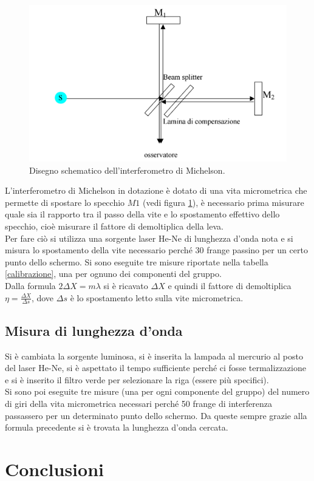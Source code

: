 \documentclass[10pt,a4paper]{article}
\begin{document}
\begin{figure}[!htb]
  \centering
  \includegraphics[scale=.5]{interferometro.png}
\caption{Disegno schematico dell'interferometro di Michelson.}
\label{int}
\end{figure}

L'interferometro di Michelson in dotazione è dotato di una vita micrometrica che permette di spostare lo specchio $M1$ (vedi figura \ref{int}), è necessario prima misurare quale sia il rapporto tra il passo della vite e lo spostamento effettivo dello specchio, cioè misurare il fattore di demoltiplica della leva. \\
Per fare ciò si utilizza una sorgente laser He-Ne di lunghezza d'onda nota e si misura lo spostamento della vite necessario perché 30 frange passino per un certo punto dello schermo. Si sono eseguite tre misure riportate nella tabella \ref{calibrazione}, una per ognuno dei componenti del gruppo.\\

Dalla formula $2 \Delta X = m \lambda$ si è ricavato $\Delta X$ e quindi il fattore di demoltiplica $\eta = \frac{\Delta X}{\Delta s}$, dove $\Delta s$ è lo spostamento letto sulla vite micrometrica.

\subsection{Misura di lunghezza d'onda}
Si è cambiata la sorgente luminosa, si è inserita la lampada al mercurio al posto del laser He-Ne, si è aspettato il tempo sufficiente perché ci fosse termalizzazione e si è inserito il filtro verde per selezionare la riga (essere più specifici).\\
Si sono poi eseguite tre misure (una per ogni componente del gruppo) del numero di giri della vita micrometrica necessari perché 50 frange di interferenza passassero per un determinato punto dello schermo. Da queste sempre grazie alla formula precedente si è trovata la lunghezza d'onda cercata.

\section{Conclusioni}
\end{document}

